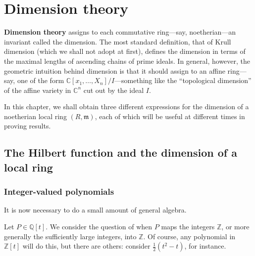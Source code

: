 \chapter{Dimension theory}

\textbf{Dimension theory} assigns to each commutative ring---say,
noetherian---an invariant called the dimension. The most standard definition,
that of Krull dimension (which we shall not adopt at first), defines the
dimension in terms of the maximal lengths of ascending chains of prime ideals. 
In general, however, the geometric intuition behind dimension is that it
should assign to an affine ring---say, one of the form $\mathbb{C}[x_1, \dots,
X_n]/I$---something like the ``topological dimension'' of the affine variety
in $\mathbb{C}^n$ cut out by the ideal $I$. 

In this chapter, we shall obtain three different expressions for the dimension
of a noetherian local ring $(R, \mathfrak{m})$, each of which will be useful
at different times in proving results. 

\section{The Hilbert function and the dimension of a local ring}
\subsection{Integer-valued polynomials}

It is now necessary to do a small amount of general algebra.

Let $P \in \mathbb{Q}[t]$. We consider the question of when $P$ maps the
integers $\mathbb{Z}$, or more generally the sufficiently large integers, into
$\mathbb{Z}$. Of course, any polynomial in $\mathbb{Z}[t]$ will do this, but
there are others: consider $\frac{1}{2}(t^2 -t)$, for instance.


